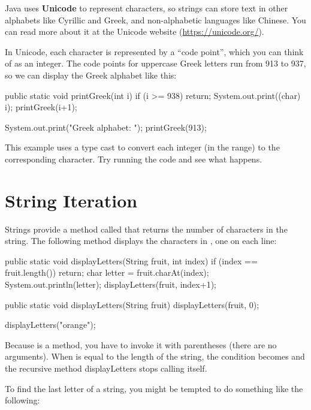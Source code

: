 Java uses {\bf Unicode} to represent characters, so strings can store text in other alphabets like Cyrillic and Greek, and non-alphabetic languages like Chinese.
You can read more about it at the Unicode website (\url{https://unicode.org/}).

In Unicode, each character is represented by a ``code point'', which you can think of as an integer.
The code points for uppercase Greek letters run from 913 to 937, so we can display the Greek alphabet like this:

\begin{code}
public static void printGreek(int i) {
    if (i >= 938) {
      return;
    }
    System.out.print((char) i);
    printGreek(i+1);
}

System.out.print("Greek alphabet: ");
printGreek(913);
\end{code}

This example uses a type cast to convert each integer (in the range) to the corresponding character.
Try running the code and see what happens.


\section{String Iteration}


Strings provide a method called  that returns the number of characters in the string.
The following method displays the characters in , one on each line:

\begin{code}
public static void displayLetters(String fruit, int index) {
    if (index == fruit.length()) {
        return;
    }
    char letter = fruit.charAt(index);
    System.out.println(letter);
    displayLetters(fruit, index+1);
}

public static void displayLetters(String fruit) {
    displayLetters(fruit, 0);
}

displayLetters("orange");
\end{code}


Because  is a method, you have to invoke it with parentheses (there are no arguments).
When  is equal to the length of the string, the condition becomes  and 
the recursive method displayLetters stops calling itself.

To find the last letter of a string, you might be tempted to do something like the following:

